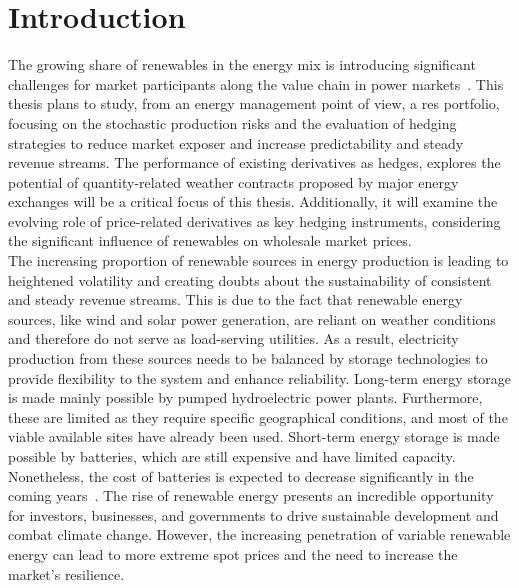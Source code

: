 
%

\chapter{Introduction}
\label{ch:introduction}

\glsresetall


  The growing share of renewables in the energy mix is introducing significant challenges for market participants
  along the value chain in power markets~\cite{hain_managing_2018}.
  This thesis plans to study, from an energy management point of view, a \gls{res} portfolio,
  focusing on the stochastic production risks and the evaluation of hedging strategies
  to reduce market exposer and increase predictability and steady revenue streams.
  The performance of existing derivatives as hedges, explores the potential of quantity-related weather contracts
  proposed by major energy exchanges will be a critical focus of this thesis.
  Additionally, it will examine the evolving role of price-related derivatives as key hedging instruments,
  considering the significant influence of renewables on wholesale market prices.\\

  The increasing proportion of renewable sources in energy production is leading to heightened volatility
  and creating doubts about the sustainability of consistent and steady revenue streams.
  This is due to the fact that renewable energy sources, like wind and solar power generation,
  are reliant on weather conditions and therefore do not serve as load-serving utilities.
  As a result, electricity production from these sources needs
  to be balanced by storage technologies to provide flexibility to the system and enhance reliability.
  Long-term energy storage is made mainly possible by pumped hydroelectric power plants.
  Furthermore, these are limited as they require specific geographical conditions,
  and most of the viable available sites have already been used.
  Short-term energy storage is made possible by batteries, which are still expensive and have limited capacity.
  Nonetheless, the cost of batteries is expected to decrease significantly in the coming
  years~\cite{viswanathan_2022_2022, cole_cost_2023}.
  The rise of renewable energy presents an incredible opportunity for investors,
  businesses, and governments to drive sustainable development and combat climate change.
  However, the increasing penetration of variable renewable energy can lead to more extreme spot prices and the need
  to increase the market's resilience. \\

